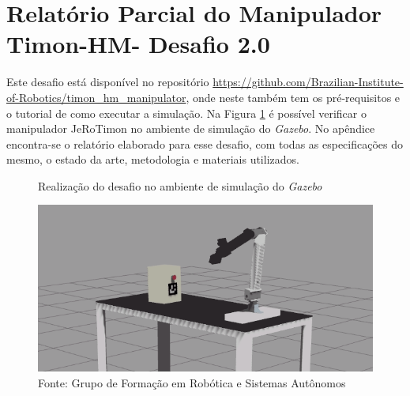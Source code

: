 




\section{Relatório Parcial do Manipulador Timon-HM- Desafio 2.0 }
\label{sec:desafio_2}
Este desafio está disponível no repositório \url{https://github.com/Brazilian-Institute-of-Robotics/timon\_hm\_manipulator}, onde neste também tem os pré-requisitos e o tutorial de como executar a simulação. Na Figura \ref{fig:manipulador_simulacao} é possível verificar o manipulador JeRoTimon no ambiente de simulação do \textit{Gazebo}. No apêndice encontra-se o relatório elaborado para esse desafio, com todas as especificações do mesmo, o estado da arte, metodologia e materiais utilizados.

\begin{figure}[H]
    \caption{Realização do desafio no ambiente de simulação do \textit{Gazebo}}
    \centering
    \includegraphics[width= \textwidth]{Figures/manipulador_simulacao.png}
    \caption*{Fonte: Grupo de Formação em Robótica e Sistemas Autônomos}
    \label{fig:manipulador_simulacao}
\end{figure}



